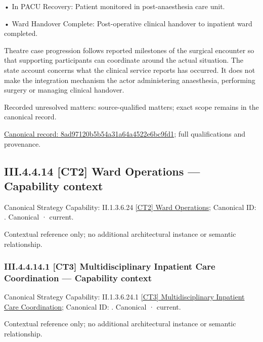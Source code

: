 •
In PACU Recovery: Patient monitored in post-anaesthesia care unit.



•
Ward Handover Complete: Post-operative clinical handover to inpatient ward completed.



Theatre case progression follows reported milestones of the surgical encounter so that supporting participants can coordinate around the actual situation. The state account concerns what the clinical service reports has occurred. It does not make the integration mechanism the actor administering anaesthesia, performing surgery or managing clinical handover.


{\small Recorded unresolved matters: source-qualified matters; exact scope remains in the canonical record.}\par
{\footnotesize \href{../../../../continuum/business/business-process/8ad97120b5b54a31a64a4522e6bc9fd1.md}{Canonical record: 8ad97120b5b54a31a64a4522e6bc9fd1}; full qualifications and provenance.}\par
\subsection*{III.4.4.14 [CT2] Ward Operations — Capability context}
\label{navigation:III.4.4.14}

{\small Canonical Strategy Capability: II.1.3.6.24 \hyperref[element:f996ecca728f4942a88b034aca818a99]{[CT2] Ward Operations}; Canonical ID: \texttt{}. Canonical · current.}\par
Contextual reference only; no additional architectural instance or semantic relationship.\par
\subsubsection*{III.4.4.14.1 [CT3] Multidisciplinary Inpatient Care Coordination — Capability context}
\label{navigation:III.4.4.14.1}

{\small Canonical Strategy Capability: II.1.3.6.24.1 \hyperref[element:c798e38e12e5428dbb8b3cabc977d430]{[CT3] Multidisciplinary Inpatient Care Coordination}; Canonical ID: \texttt{}. Canonical · current.}\par
Contextual reference only; no additional architectural instance or semantic relationship.\par
